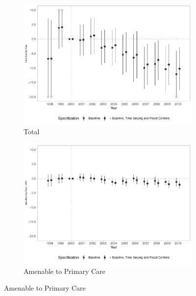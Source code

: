 \begin{figure}[h!]
    \begin{center}
    \caption{Effects on Infant Mortality Rates}\label{fig:16}
    \begin{subfigure}{0.32\textwidth}
        \caption{\scriptsize Total}\label{fig:16a}
        \centering
        \includegraphics[width=\textwidth]{plots/tx_mi_dist_ec29_baseline_dist_ec29_baseline_16.pdf}
    \end{subfigure}
    \begin{subfigure}{0.32\textwidth}
        \centering
        \caption{\scriptsize Amenable to Primary Care}\label{fig:16b}
        \includegraphics[width=\textwidth]{plots/tx_mi_icsap_dist_ec29_baseline_dist_ec29_baseline_16.pdf}
    \end{subfigure}

\end{center}
\end{figure}
